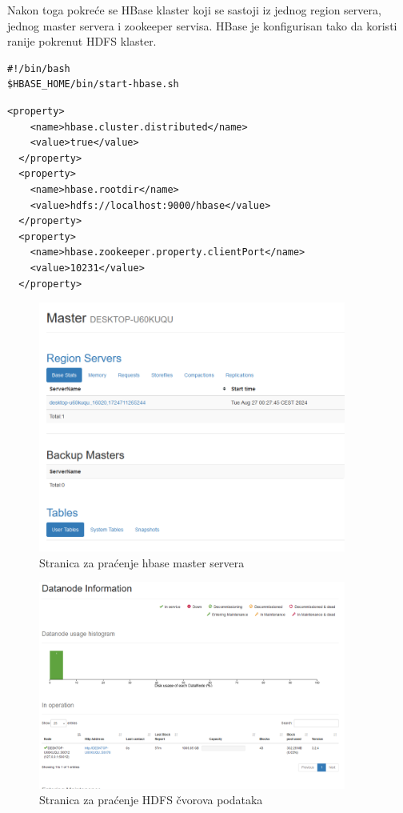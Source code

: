 \documentclass[12pt,oneside]{memoir}
\begin{document}
Nakon toga pokreće se HBase klaster koji se sastoji iz jednog region servera, jednog master servera i zookeeper servisa. HBase je konfigurisan tako da koristi ranije pokrenut HDFS klaster.

\begin{lstlisting}[title={start-hbase.sh - Komanda za pokretanje HBase-a},captionpos=b]
#!/bin/bash
$HBASE_HOME/bin/start-hbase.sh
\end{lstlisting}


\begin{lstlisting}[title={hbase-site.xml - Konfiguracija distribuiranog HBase-a},captionpos=b]
 <property>
    <name>hbase.cluster.distributed</name>
    <value>true</value>
  </property>
  <property>
    <name>hbase.rootdir</name>
    <value>hdfs://localhost:9000/hbase</value>
  </property>
  <property>
    <name>hbase.zookeeper.property.clientPort</name>
    <value>10231</value>
  </property>
\end{lstlisting}


\begin{figure}[!ht]
  \centering
  \includegraphics[width=0.9\textwidth]{hbase-master.png}
  \caption{Stranica za praćenje hbase master servera}
  \label{fig:grafikon}
\end{figure}

\pagebreak


\begin{figure}[!ht]
  \centering
  \includegraphics[width=0.9\textwidth]{datanode.png}
  \caption{Stranica za praćenje HDFS čvorova podataka}
  \label{fig:grafikon}
\end{figure}
\end{document}

